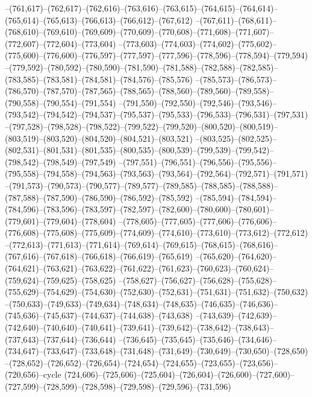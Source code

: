 --(761,617)--(762,617)--(762,616)--(763,616)--(763,615)--(764,615)--(764,614)--(765,614)--(765,613)--(766,613)--(766,612)--(767,612)
--(767,611)--(768,611)--(768,610)--(769,610)--(769,609)--(770,609)--(770,608)--(771,608)--(771,607)--(772,607)--(772,604)--(773,604)
--(773,603)--(774,603)--(774,602)--(775,602)--(775,600)--(776,600)--(776,597)--(777,597)--(777,596)--(778,596)--(778,594)--(779,594)
--(779,592)--(780,592)--(780,590)--(781,590)--(781,588)--(782,588)--(782,585)--(783,585)--(783,581)--(784,581)--(784,576)--(785,576)
--(785,573)--(786,573)--(786,570)--(787,570)--(787,565)--(788,565)--(788,560)--(789,560)--(789,558)--(790,558)--(790,554)--(791,554)
--(791,550)--(792,550)--(792,546)--(793,546)--(793,542)--(794,542)--(794,537)--(795,537)--(795,533)--(796,533)--(796,531)--(797,531)
--(797,528)--(798,528)--(798,522)--(799,522)--(799,520)--(800,520)--(800,519)--(803,519)--(803,520)--(804,520)--(804,521)--(803,521)
--(803,525)--(802,525)--(802,531)--(801,531)--(801,535)--(800,535)--(800,539)--(799,539)--(799,542)--(798,542)--(798,549)--(797,549)
--(797,551)--(796,551)--(796,556)--(795,556)--(795,558)--(794,558)--(794,563)--(793,563)--(793,564)--(792,564)--(792,571)--(791,571)
--(791,573)--(790,573)--(790,577)--(789,577)--(789,585)--(788,585)--(788,588)--(787,588)--(787,590)--(786,590)--(786,592)--(785,592)
--(785,594)--(784,594)--(784,596)--(783,596)--(783,597)--(782,597)--(782,600)--(780,600)--(780,601)--(779,601)--(779,604)--(778,604)
--(778,605)--(777,605)--(777,606)--(776,606)--(776,608)--(775,608)--(775,609)--(774,609)--(774,610)--(773,610)--(773,612)--(772,612)
--(772,613)--(771,613)--(771,614)--(769,614)--(769,615)--(768,615)--(768,616)--(767,616)--(767,618)--(766,618)--(766,619)--(765,619)
--(765,620)--(764,620)--(764,621)--(763,621)--(763,622)--(761,622)--(761,623)--(760,623)--(760,624)--(759,624)--(759,625)--(758,625)
--(758,627)--(756,627)--(756,628)--(755,628)--(755,629)--(754,629)--(754,630)--(752,630)--(752,631)--(751,631)--(751,632)--(750,632)
--(750,633)--(749,633)--(749,634)--(748,634)--(748,635)--(746,635)--(746,636)--(745,636)--(745,637)--(744,637)--(744,638)--(743,638)
--(743,639)--(742,639)--(742,640)--(740,640)--(740,641)--(739,641)--(739,642)--(738,642)--(738,643)--(737,643)--(737,644)--(736,644)
--(736,645)--(735,645)--(735,646)--(734,646)--(734,647)--(733,647)--(733,648)--(731,648)--(731,649)--(730,649)--(730,650)--(728,650)
--(728,652)--(726,652)--(726,654)--(724,654)--(724,655)--(723,655)--(723,656)--(720,656)--cycle
(724,606)--(725,606)--(725,604)--(726,604)--(726,600)--(727,600)--(727,599)--(728,599)--(728,598)--(729,598)--(729,596)--(731,596)
